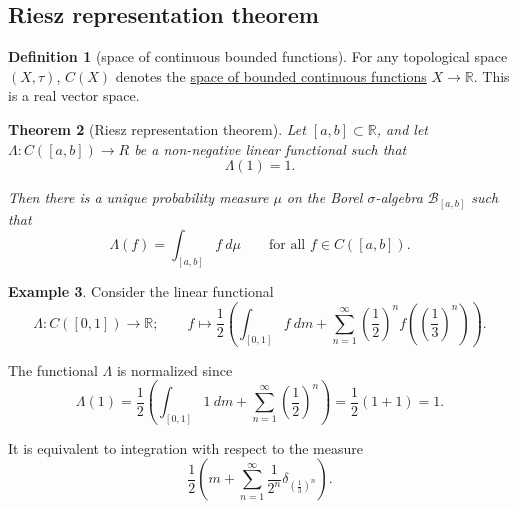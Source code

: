 \documentclass[a4paper,12pt]{scrreprt}
\newcommand{\R}{\mathbb{R}}
\newcommand{\defn}[1]{\ul{#1}}
\theoremstyle{definition}
\newtheorem{definition}{Definition}
\newtheorem{example}[definition]{Example}
\theoremstyle{plain}
\newtheorem{theorem}[definition]{Theorem}
\theoremstyle{remark}
\begin{document}
\subsection{Riesz representation theorem}
\begin{definition}[space of continuous bounded functions]
  \label{def:spaceofboundedlinearfunctions}
  For any topological space $(X, \tau)$, $C(X)$ denotes the \defn{space of bounded continuous functions} $X \to \R$. This is a real vector space.
\end{definition}

\begin{theorem}[Riesz representation theorem]
  \label{thm:rieszrepresentationtheorem}
  Let $[a, b] \subset \R$, and let $\Lambda\colon C([a, b]) \to R$ be a non-negative linear functional such that
  \begin{equation*}
    \Lambda(1) = 1.
  \end{equation*}

  Then there is a unique probability measure $\mu$ on the Borel $\sigma$-algebra $\mathcal{B}_{[a, b]}$ such that
  \begin{equation*}
    \Lambda(f) = \int_{[a, b]} f\ d\mu\qquad\text{for all }f \in C([a, b]).
  \end{equation*}
\end{theorem}

\begin{example}
  Consider the linear functional
  \begin{equation*}
    \Lambda\colon C([0, 1]) \to \R;\qquad f \mapsto \frac{1}{2}\left( \int_{[0, 1]} f\ dm + \sum_{n=1}^{\infty} {\left( \frac{1}{2} \right)}^{n} f\left( {\left( \frac{1}{3} \right)}^{n} \right) \right).
  \end{equation*}

  The functional $\Lambda$ is normalized since
  \begin{equation*}
    \Lambda(1) = \frac{1}{2}\left( \int_{[0, 1]} 1\ dm + \sum_{n=1}^{\infty} {\left( \frac{1}{2} \right)}^{n} \right) = \frac{1}{2}\left( 1 + 1 \right) = 1.
  \end{equation*}

  It is equivalent to integration with respect to the measure
  \begin{equation*}
    \frac{1}{2}\left( m + \sum_{n=1}^{\infty} \frac{1}{2^{n}} \delta_{{\left( \frac{1}{3} \right)}^{n}} \right).
  \end{equation*}
\end{example}
\end{document}
